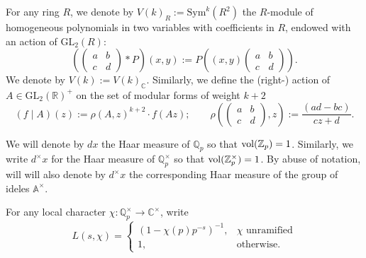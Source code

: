 \documentclass{amsart}
\newcommand{\GL}{{\mathrm{GL}}}
\newcommand{\Z}{{\mathbb Z}}
\newcommand{\A}{{\mathbb A}}
\newcommand{\Q}{{\mathbb Q}}
\newcommand{\C}{{\mathbb C}}
\newcommand{\R}{{\mathbb R}}
\newcommand{\Sym}{{\mathrm {Sym}}}
\begin{document}
For any ring $R$,
we denote by 
$V(k)_R:=\Sym^{k}(R^2)$ the $R$-module of homogeneous polynomials in two variables with coefficients in $R$, endowed with an action of $\GL_2(R)$:
\begin{equation}\label{actpol}
\left( \left(\begin{array}{cc}a&b\\c&d\end{array}\right)\ast P\right)(x,y):=%
P\left((x,y)\left(\begin{array}{cc}a&b\\c&d\end{array}\right)\right).
\end{equation}
We denote by $V(k):=V(k)_\C$.
Similarly, we define the (right-) action of $A\in\GL_2(\R)^+$ on the set of modular forms of weight $k+2$
\[
(f\mid A)(z):=\rho(A,z)^{k+2}\cdot f(Az);%
\qquad \rho\left(\left(\begin{array}{cc}a&b\\c&d\end{array}\right),z\right):=\frac{(ad-bc)}{cz+d}.
\]

We will denote by $dx$ the Haar measure of $\Q_p$ so that ${\rm vol}(\Z_p)=1$. Similarly, we write $d^\times x$ for the Haar measure of $\Q_p^\times$ so that ${\rm vol}(\Z_p^\times)=1$. By abuse of notation, will will also denote by $d^\times x$ the corresponding Haar measure of the group of ideles $\A^\times$.   

For any local character $\chi:\Q_p^\times\rightarrow\C^\times$, write
\[
L(s,\chi)=\left\{\begin{array}{lc}(1-\chi(p)p^{-s})^{-1},&\chi\mbox{ unramified}\\
1,&\mbox{otherwise.}\end{array}\right.
\]
\end{document}
